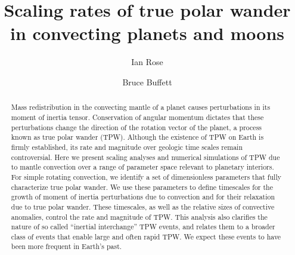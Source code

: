\documentclass[preprint,12pt,authoryear]{elsarticle}
\begin{document}
\begin{frontmatter}



\title{Scaling rates of true polar wander in convecting planets and moons}


\author{Ian Rose}
\author{Bruce Buffett}


\address{}

\begin{abstract}
Mass redistribution in the convecting mantle of a planet causes perturbations in its moment of inertia tensor. 
Conservation of angular momentum dictates that these perturbations change the direction of the rotation vector of the planet, a process known as true polar wander (TPW). 
Although the existence of TPW on Earth is firmly established, its rate and magnitude over geologic time scales remain controversial. 
Here we present scaling analyses and numerical simulations of TPW due to mantle convection over a range of parameter space relevant to planetary interiors. 
For simple rotating convection, we identify a set of dimensionless parameters that fully characterize true polar wander. We use these parameters to define  timescales for the growth of moment of inertia perturbations due to convection and for their relaxation due to true polar wander. 
These timescales, as well as the relative sizes of convective anomalies, control the rate and magnitude of TPW.
This analysis also clarifies the nature of so called ``inertial interchange'' TPW events, and relates them to a  broader class of events that enable large and often rapid TPW. We expect these events to have been more frequent in Earth's past.
\end{abstract}


\end{frontmatter}
\end{document}
